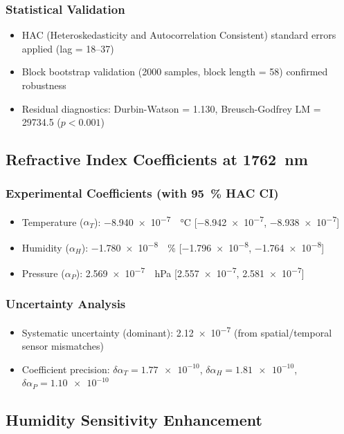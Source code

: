 \documentclass[aps,prl,reprint,groupedaddress,onecolumn,superscriptaddress]{revtex4-2}
\begin{document}
\subsubsection{Statistical Validation}
\begin{itemize}
    \item HAC (Heteroskedasticity and Autocorrelation Consistent)\cite{andrews1991heteroskedasticity} standard errors applied (lag = \numrange{18}{37})
    \item Block bootstrap validation (\num{2000} samples, block length = \num{58}) confirmed robustness
    \item Residual diagnostics: Durbin-Watson = \num{1.130}, Breusch-Godfrey LM = \num{29734.5} ($p < \num{0.001}$)
\end{itemize}

\subsection{Refractive Index Coefficients at \SI{1762}{\nano\meter}}

\subsubsection{Experimental Coefficients (with \SI{95}{\percent} HAC CI)}
\begin{itemize}
    \item Temperature ($\alpha_T$): \SI{-8.940e-7}{\per\degreeCelsius} [\num{-8.942e-7}, \num{-8.938e-7}]
    \item Humidity ($\alpha_H$): \SI{-1.780e-8}{\per\percent} [\num{-1.796e-8}, \num{-1.764e-8}]
    \item Pressure ($\alpha_P$): \SI{+2.569e-7}{\per\hecto\pascal} [\num{2.557e-7}, \num{2.581e-7}]
\end{itemize}

\subsubsection{Uncertainty Analysis}
\begin{itemize}
    \item Systematic uncertainty (dominant): \num{2.12e-7} (from spatial/temporal sensor mismatches)
    \item Coefficient precision: $\delta\alpha_T = \num{1.77e-10}$, $\delta\alpha_H = \num{1.81e-10}$, $\delta\alpha_P = \num{1.10e-10}$
\end{itemize}

\subsection{Humidity Sensitivity Enhancement}
\end{document}
